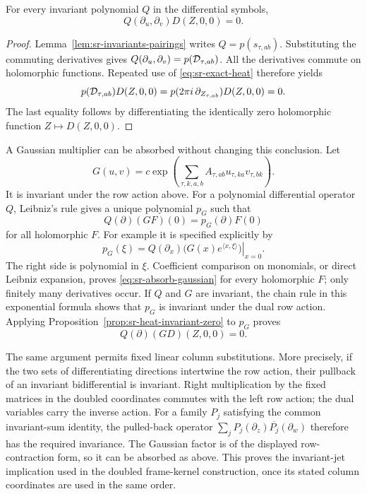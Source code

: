 \begin{srproposition}\label{prop:sr-heat-invariant-zero}
For every invariant polynomial \(Q\) in the differential
symbols,
\[
                 Q(\partial_u,\partial_v)
                                    D(Z,0,0)=0 .
\]
\end{srproposition}

\begin{proof}
Lemma~\ref{lem:sr-invariants-pairings} writes
\(Q=p(s_{\tau,ab})\).
Substituting the commuting derivatives gives
\(Q(\partial_u,\partial_v)=p({\cal D}_{\tau,ab})\).
All the derivatives commute on holomorphic functions.
Repeated use of \eqref{eq:sr-exact-heat} therefore yields
\[
 p({\cal D}_{\tau,ab})D(Z,0,0)
   =p(2\pi i\,\partial_{Z_{\tau,ab}})D(Z,0,0)=0.
\]
The last equality follows by differentiating the identically
zero holomorphic function \(Z\mapsto D(Z,0,0)\).
\end{proof}

A Gaussian multiplier can be absorbed without changing this
conclusion.  Let
\[
 G(u,v)=c\exp\!\left(\sum_{\tau,k,a,b}
                     A_{\tau,ab}u_{\tau,ka}v_{\tau,bk}\right).
\]
It is invariant under the row action above.
For a polynomial differential operator \(Q\), Leibniz's rule
gives a unique polynomial \(p_G\) such that
\begin{equation}\label{eq:sr-absorb-gaussian}
   Q(\partial)(G F)(0)=p_G(\partial)F(0)
\end{equation}
for all holomorphic \(F\).
For example it is specified explicitly by
\[
              p_G(\xi)
                  =\left.Q(\partial_x)
                       \bigl(G(x)e^{\langle x,\xi\rangle}\bigr)
                                                     \right|_{x=0}.
\]
The right side is polynomial in \(\xi\).
Coefficient comparison on monomials, or direct Leibniz
expansion, proves \eqref{eq:sr-absorb-gaussian} for every
holomorphic \(F\); only finitely many derivatives occur.
If \(Q\) and \(G\) are invariant, the chain rule in this
exponential formula shows that \(p_G\) is invariant under
the dual row action.
Applying Proposition~\ref{prop:sr-heat-invariant-zero} to
\(p_G\) proves
\[
                   Q(\partial)(G D)(Z,0,0)=0 .
\]

The same argument permits fixed linear column substitutions.
More precisely, if the two sets of differentiating
directions intertwine the row action, their pullback of an
invariant bidifferential is invariant.
Right multiplication by the fixed matrices in the doubled
coordinates commutes with the left row action; the dual
variables carry the inverse action.
For a family \(P_j\) satisfying the common invariant-sum
identity, the pulled-back operator
\(\sum_jP_j(\partial_z)\overline{P_j}(\partial_w)\)
therefore has the required invariance.
The Gaussian factor is of the displayed row-contraction
form, so it can be absorbed as above.
This proves the invariant-jet implication used in the
doubled frame-kernel construction, once its stated column
coordinates are used in the same order.

